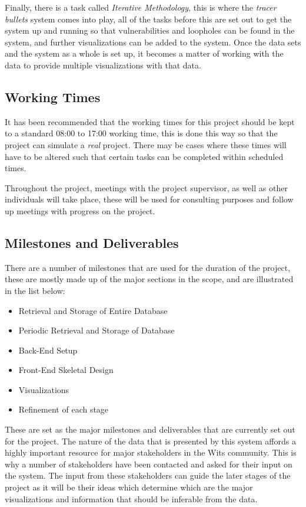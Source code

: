 \documentclass[12pt,onecolumn]{IEEEtran}
\begin{document}
Finally, there is a task called \textit{Iterative Methodology}, this is where the \textit{tracer bullets} system comes into play, all of the tasks before this are set out to get the system up and running so that vulnerabilities and loopholes can be found in the system, and further visualizations can be added to the system. Once the data sets and the system as a whole is set up, it becomes a matter of working with the data to provide multiple visualizations with that data.

\subsection{Working Times} \label{sec:WorkingTimes}
It has been recommended that the working times for this project should be kept to a standard 08:00 to 17:00 working time, this is done this way so that the project can simulate a \textit{real} project. 
There may be cases where these times will have to be altered such that certain tasks can be completed within scheduled times.

Throughout the project, meetings with the project supervisor, as well as other individuals will take place, these will be used for consulting purposes and follow up meetings with progress on the project.


\subsection{Milestones and Deliverables} \label{sec:MilestonesAndDeliverables}
There are a number of milestones that are used for the duration of the project, these are mostly made up of the major sections in the scope, and are illustrated in the list below:

\begin{itemize}
    \item Retrieval and Storage of Entire Database
    \item Periodic Retrieval and Storage of Database
    \item Back-End Setup
    \item Front-End Skeletal Design
    \item Visualizations
    \item Refinement of each stage
\end{itemize}

These are set as the major milestones and deliverables that are currently set out for the project. The nature of the data that is presented by this system affords a highly important resource for major stakeholders in the Wits community. This is why a number of stakeholders have been contacted and asked for their input on the system. 
The input from these stakeholders can guide the later stages of the project as it will be their ideas which determine which are the major visualizations and information that should be inferable from the data.
\end{document}

